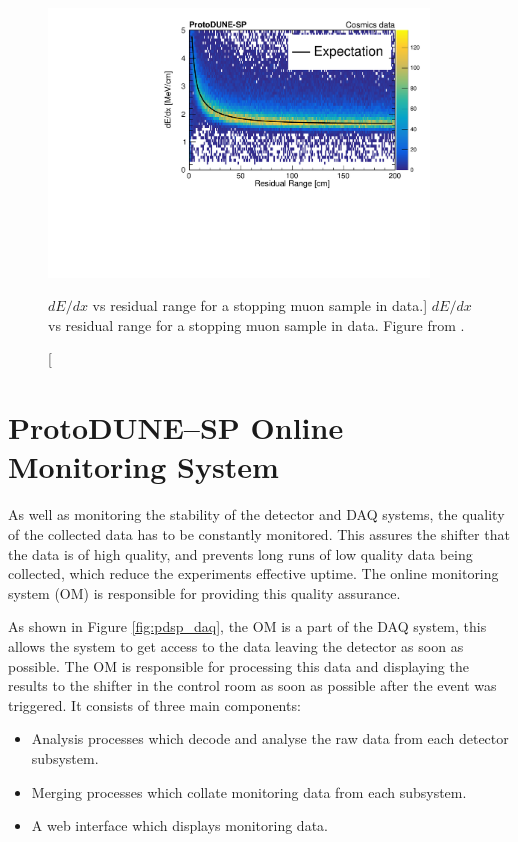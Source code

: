 \begin{figure}

	\centering

	\includegraphics[width=0.9\textwidth]{figures/dedx_v_rr.pdf}

	\caption
	[$dE/dx$ vs residual range for a stopping muon sample in \protodune{} data.]
	{$dE/dx$ vs residual range for a stopping muon sample in \protodune{} data. 
	Figure from \cite{protoduneperf}.}

	\label{fig:dedx_v_rr}

\end{figure}


\section{ProtoDUNE--SP Online Monitoring System} \label{sec:pdsp_om}

As well as monitoring the stability of the detector and DAQ systems, the quality
of the collected data has to be constantly monitored. This assures the shifter 
that the data is of high quality, and prevents long runs of low quality data
being collected, which reduce the experiments effective uptime. The online
monitoring system (OM) is responsible for providing this quality assurance.

As shown in Figure \ref{fig:pdsp_daq}, the OM is a part of the \protodune{} DAQ
system, this allows the system to get access to the data leaving the detector as
soon as possible. The OM is responsible for processing this data and displaying
the results to the shifter in the control room as soon as possible after the
event was triggered. It consists of three main components:
\begin{itemize}
	\item Analysis processes which decode and analyse the raw data from each 
		detector subsystem.
	\item Merging processes which collate monitoring data from each subsystem.
	\item A web interface which displays monitoring data.
\end{itemize}

